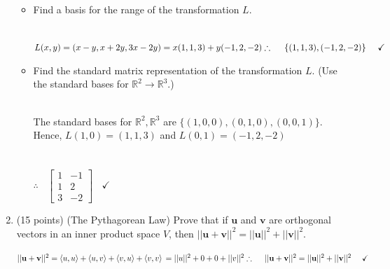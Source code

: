\documentclass[fleqn]{article}
\begin{document}
\begin{enumerate}
\begin{itemize}
        \item Find a basis for the range of the transformation $L$.

          \textcolor{hwColor}{
            \\
            $
              L(x,y)=(x-y, x+2y, 3x-2y)=x(1,1,3)+y(-1,2,-2)
              \\
              \\
              \\
              \therefore ~~~~ \{ (1, 1, 3), (-1, 2, -2) \} ~~~~\checkmark
            $
          }

        \item Find the standard matrix representation of the transformation $L$. (Use the standard bases for $\mathbb{R}^2 \rightarrow \mathbb{R}^3$.)

          \textcolor{hwColor}{
            \\
            The standard bases for $\mathbb{R}^2, \mathbb{R}^3$ are $\{ (1, 0, 0), (0, 1, 0), (0, 0, 1) \}$.
            Hence, $L(1,0)=(1, 1, 3)$ and $L(0,1)=(-1, 2, -2)$
            \\
            \\
            \\
            $
              \therefore ~~~~ \begin{bmatrix}
                1 & -1
                \\
                1 & 2
                \\
                3 & -2
              \end{bmatrix} ~~~~ \checkmark
            $
          }

      \end{itemize}


    \item (15 points) (The Pythagorean Law) Prove that if $\mathbf{u}$ and $\mathbf{v}$ are orthogonal vectors in an inner
    product space $V$, then $||\mathbf{u}+\mathbf{v}||^2=||\mathbf{u}||^2+||\mathbf{v}||^2$.

      \textcolor{hwColor}{
        $
          ||\mathbf{u}+\mathbf{v}||^2=
          \left\langle u, u\right\rangle
          +\left\langle u, v \right\rangle
          +\left\langle v, u\right\rangle
          +\left\langle v, v\right\rangle
          \\
          \\
          \\
          =||u||^2+0+0+||v||^2 
          \\
          \\
          \\
          \therefore ~~~~ ||\mathbf{u}+\mathbf{v}||^2=||\mathbf{u}||^2+||\mathbf{v}||^2 ~~~~ \checkmark
        $
      }


\end{enumerate}
\end{document}
